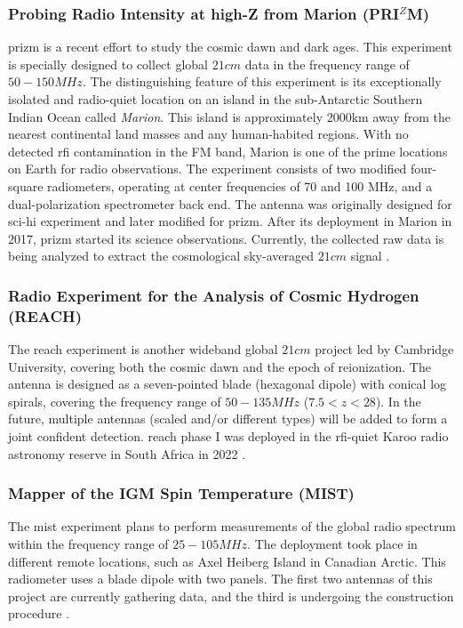 \documentclass[12pt, TexShade, letterpaper]{report}
\begin{document}
\subsubsection{Probing Radio Intensity at high-Z from Marion (PRI$^Z$M)}
\gls{prizm} is a recent effort to study the cosmic dawn and dark ages. This experiment is specially designed to collect global $21cm$ data in the frequency range of $50-150MHz$. The distinguishing feature of this experiment is its exceptionally isolated and radio-quiet location on an island in the sub-Antarctic Southern Indian Ocean called \emph{Marion}. This island is approximately 2000km away from the nearest continental land masses and any human-habited regions. With no detected \gls{rfi} contamination in the FM band, Marion is one of the prime locations on Earth for radio observations. The experiment consists of two modified four-square radiometers, operating at center frequencies of 70 and 100 MHz, and a dual-polarization spectrometer back end. The antenna was originally designed for \gls{sci-hi} experiment \cite{sci-hi_1, sci-hi_2} and later modified for \gls{prizm}. After its deployment in Marion in 2017, \gls{prizm} started its science observations. Currently, the collected raw data is being analyzed to extract the cosmological sky-averaged $21cm$ signal \cite{prizm_2017, prizm_thesis}.\par 

\subsubsection{Radio Experiment for the Analysis of Cosmic Hydrogen (REACH)}
The \gls{reach} experiment is another wideband global $21cm$ project led by Cambridge University, covering both the cosmic dawn and the epoch of reionization. The antenna is designed as a seven-pointed blade (hexagonal dipole) with conical log spirals, covering the frequency range of $50-135MHz$ ($7.5 < z < 28$). In the future, multiple antennas (scaled and/or different types) will be added to form a joint confident detection. \gls{reach} phase I was deployed in the \gls{rfi}-quiet Karoo radio astronomy reserve in South Africa in 2022 \cite{reach_z, reach, reach_design}. \par

\subsubsection{Mapper of the IGM Spin Temperature (MIST)}
The \gls{mist} experiment plans to perform measurements of the global radio spectrum within the frequency range of $25-105 MHz$. The deployment took place in different remote locations, such as Axel Heiberg Island in Canadian Arctic. This radiometer uses a blade dipole with two panels. The first two antennas of this project are currently gathering data, and the third is undergoing the construction procedure \cite{mist, mist_presentation, mist_website}.
\end{document}
